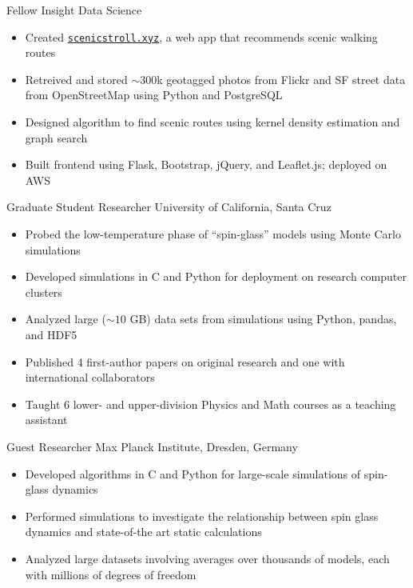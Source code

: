 \documentclass[11pt,serif]{cv}
\begin{document}
\begin{cvjobs}
    {Fellow}
    {Insight Data Science}
    {%
      \begin{itemize}
        \item Created
          \href{http://scenicstroll.xyz}{\texttt{scenicstroll.xyz}}, a web app
          that recommends scenic walking routes
        \item Retreived and stored $\sim 300$k geotagged photos from Flickr and
          SF street data from OpenStreetMap using Python and PostgreSQL
        \item Designed algorithm to find scenic routes using kernel density
          estimation and graph search
        \item Built frontend using Flask, Bootstrap, jQuery, and Leaflet.js; deployed on AWS
      \end{itemize}
    }
    {Graduate Student Researcher}
    {University of California, Santa Cruz}
    {%
      \begin{itemize}[topsep=0pt]
        \item Probed the low-temperature phase of ``spin-glass'' models using
          Monte Carlo simulations
        \item Developed simulations in C and Python for deployment on research
          computer clusters
        \item Analyzed large ($\sim 10$ GB) data sets from simulations using
          Python, pandas, and HDF5
        \item Published 4 first-author papers on original research and one
          with international collaborators
        \item Taught 6 lower- and upper-division Physics and Math courses as a
          teaching assistant
      \end{itemize}
    }
    {Guest Researcher}
    {Max Planck Institute, Dresden, Germany}
    {%
      \begin{itemize}
        \item
          Developed algorithms in C and Python for large-scale simulations of
          spin-glass dynamics
        \item
          Performed simulations to investigate the relationship between spin
          glass dynamics and state-of-the art static calculations
        \item
          Analyzed large datasets involving averages over thousands of models,
          each with millions of degrees of freedom

\end{itemize}}
\end{cvjobs}
\end{document}

